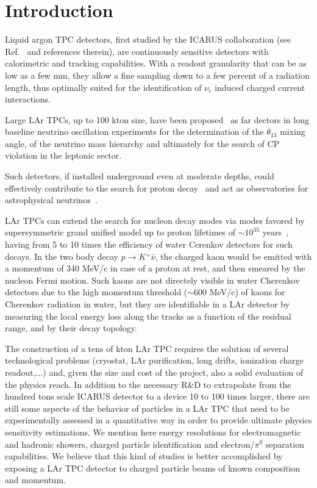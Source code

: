 \section{Introduction}
Liquid argon TPC detectors, first studied by the ICARUS collaboration (see Ref.~\cite{Amerio:2004ze} and references therein), are continuously sensitive detectors with calorimetric and tracking capabilities. With a readout granularity that can be as low as a few mm, they allow a fine sampling down to a few percent of a radiation length, thus optimally suited for the identification of $\nu_e$ induced charged current interactions. 

Large LAr TPCs, up to 100 kton size, have been proposed~\cite{Rubbia:2004tz,Badertscher:2008bp,Agarwalla:2011hh,Akiri:2011dv} as far dectors in long baseline neutrino oscillation experiments for the determination of the $\theta_{13}$ mixing angle, of the neutrino mass hierarchy and ultimately for the search of CP violation in the leptonic sector.

Such detectors, if installed underground even at moderate depths, could effectively contribute to the search for proton decay~\cite{Bueno:2007um} and act as observatories for astrophysical neutrinos~\cite{GilBotella:2004bv,Rubbia:1999py,Conrad:2010mh}. 

LAr TPCs can extend the search for nucleon decay modes via modes favored by supersymmetric grand unified model up to proton lifetimes of $\sim 10^{35}$ years~\cite{Bueno:2007um}, having from 5 to 10 times the efficiency of water Cerenkov detectors for such decays. In the two body decay $p \longrightarrow K{^+} \bar{\nu}$, the charged kaon would be emitted with a momentum of 340 MeV/c in case of a proton at rest, and then smeared by the nucleon Fermi
motion. Such kaons are not directely visible in water Cherenkov detectors due to the high momentum threshold ($\sim 600$ MeV/c) of kaons for Cherenkov radiation in water, but they are identifiable in a LAr detector by measuring the local energy loss along the tracks as a function of the residual range, and by their decay topology.

The construction of a tens of kton LAr TPC requires the solution of several technological problems (cryostat, LAr purification, long drifts, ionization charge readout,...) and, given the size and cost of the project, also a solid evaluation of the physics reach. In addition to the necessary R\&D to extrapolate from the hundred tons scale ICARUS detector to a device 10 to 100 times larger, there are still some aspects of the behavior of particles in a LAr TPC that need to be experimentally assessed in a quantitative way in order to provide ultimate physics sensitivity estimations. We mention here energy resolutions for electromagnetic and hadronic showers, charged particle identification and electron/$\pi^0$ separation capabilities. We believe that this kind of studies is better accomplished by exposing a LAr TPC detector to charged particle beams of known composition and momentum.

